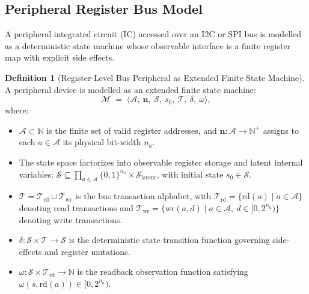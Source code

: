 \documentclass[preprint,review]{elsarticle}
\theoremstyle{definition}
\newtheorem{definition}{Definition}[section]
\begin{document}
\subsection{Peripheral Register Bus Model}
\label{sec:bus-model}

A peripheral integrated circuit (IC) accessed over an I2C or SPI bus is modelled as a
deterministic state machine whose observable interface is a finite register map with
explicit side effects.

\begin{definition}[Register-Level Bus Peripheral as Extended Finite State Machine]
A peripheral device is modelled as an extended finite state machine:
\begin{equation}
\mathcal{M} \;=\; \bigl\langle \mathcal{A},\ \mathbf{n},\ \mathcal{S},\ s_0,\ \mathcal{T},\ \delta,\ \omega \bigr\rangle,
\label{eq:peripheral}
\end{equation}
where:
\begin{itemize}
    \item $\mathcal{A} \subset \mathbb{N}$ is the finite set of valid register addresses, and $\mathbf{n}: \mathcal{A} \rightarrow \mathbb{N}^+$ assigns to each $a \in \mathcal{A}$ its physical bit-width $n_a$.
    \item The state space factorizes into observable register storage and latent internal variables: $\mathcal{S} \subseteq \prod_{a \in \mathcal{A}} \{0,1\}^{n_a} \times \mathcal{S}_{\mathrm{latent}}$, with initial state $s_0 \in \mathcal{S}$.
    \item $\mathcal{T} = \mathcal{T}_{\mathrm{rd}} \cup \mathcal{T}_{\mathrm{wr}}$ is the bus transaction alphabet, with $\mathcal{T}_{\mathrm{rd}} = \{\mathrm{rd}(a) \mid a \in \mathcal{A}\}$ denoting read transactions and $\mathcal{T}_{\mathrm{wr}} = \{\mathrm{wr}(a, d) \mid a \in \mathcal{A},\ d \in [0, 2^{n_a})\}$ denoting write transactions.
    \item $\delta: \mathcal{S} \times \mathcal{T} \rightarrow \mathcal{S}$ is the deterministic state transition function governing side-effects and register mutations.
    \item $\omega: \mathcal{S} \times \mathcal{T}_{\mathrm{rd}} \rightarrow \mathbb{N}$ is the readback observation function satisfying $\omega(s, \mathrm{rd}(a)) \in [0, 2^{n_a})$.
\end{itemize}
\end{definition}
\end{document}
